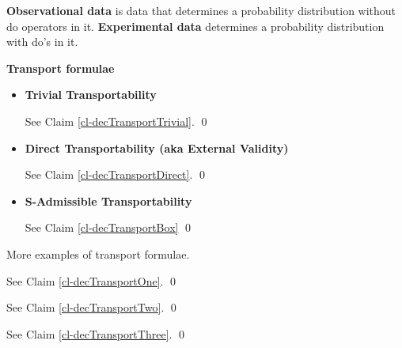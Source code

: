 {\bf Observational data} is data that
determines a probability distribution
without do operators in it.
 {\bf Experimental data} 
determines a probability distribution
 with do's in it.




{\bf Transport formulae}

\begin{itemize}
\item {\bf Trivial Transportability}

\begin{claim}
\decTransportTrivial
\end{claim}
\proof
See Claim \ref{cl-decTransportTrivial}.
\qed

\item{\bf Direct Transportability 
(aka External Validity)}

\begin{claim}
\decTransportDirect
\end{claim}
\proof
See Claim \ref{cl-decTransportDirect}.
\qed



\item {\bf S-Admissible Transportability}


\begin{claim}
\decTransportBox
\end{claim}
\proof
See Claim \ref{cl-decTransportBox}
\qed

\end{itemize}

More examples of transport formulae.

\begin{claim}
\decTransportOne
\end{claim}
\proof
See Claim \ref{cl-decTransportOne}.
\qed

\begin{claim}
\decTransportTwo
\end{claim}
\proof
See Claim \ref{cl-decTransportTwo}.
\qed

\begin{claim}
\decTransportThree
\end{claim}
\proof
See Claim \ref{cl-decTransportThree}.
\qed